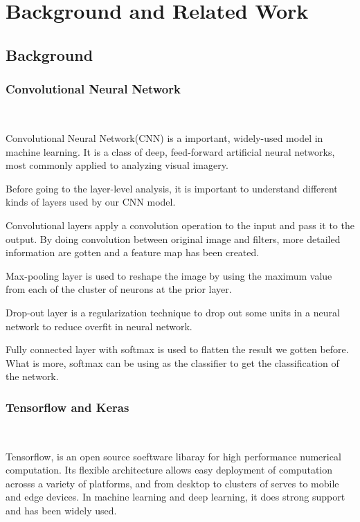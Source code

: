\documentclass[conference]{IEEEtran}
\begin{document}
\section{Background and Related Work}

\subsection{Background}

\subsubsection{Convolutional Neural Network}

\

\noindent
Convolutional Neural Network(CNN) is a important, widely-used model in machine learning. It is a class of deep, feed-forward artificial neural networks, most commonly applied to analyzing visual imagery. 

Before going to the layer-level analysis, it is important to understand different kinds of layers used by our CNN model. 

Convolutional layers apply a convolution operation to the input and pass it to the output. By doing convolution between original image and filters, more detailed information are gotten and a feature map has been created.

Max-pooling layer is used to reshape the image by using the maximum value from each of the cluster of neurons at the prior layer.

Drop-out layer is a regularization technique to drop out some units in a neural network to reduce overfit in neural network.

Fully connected layer with softmax is used to flatten the result we gotten before. What is more, softmax can be using as the classifier to get the classification of the network.


\subsubsection{Tensorflow and Keras}

\

\noindent

Tensorflow, is an open source soeftware libaray for high performance numerical computation. Its flexible architecture allows easy deployment of computation acrosss a variety of platforms, and from desktop to clusters of serves to mobile and edge devices. In machine learning and deep learning, it does strong support and has been widely used.
\end{document}
